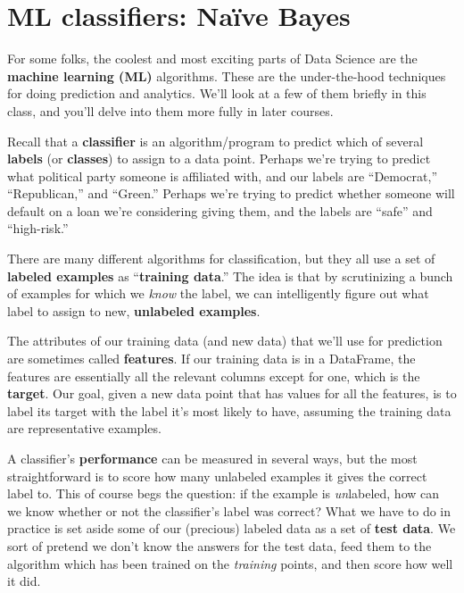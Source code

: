 

\chapter{ML classifiers: Na\"{i}ve Bayes}
\label{ch:naiveBayes}

For some folks, the coolest and most exciting parts of Data Science are the
\textbf{machine learning (ML)} algorithms. These are the under-the-hood
techniques for doing prediction and analytics. We'll look at a few of them
briefly in this class, and you'll delve into them more fully in later courses.

Recall that a \textbf{classifier} is an algorithm/program to predict which of
several \textbf{labels} (or \textbf{classes}) to assign to a data point.
Perhaps we're trying to predict what political party someone is affiliated
with, and our labels are ``Democrat,'' ``Republican,'' and ``Green.'' Perhaps
we're trying to predict whether someone will default on a loan we're
considering giving them, and the labels are ``safe'' and ``high-risk.''

There are many different algorithms for classification, but they all use a set
of \textbf{labeled examples} as ``\textbf{training data}.'' The idea is that by
scrutinizing a bunch of examples for which we \textit{know} the label, we can
intelligently figure out what label to assign to new, \textbf{unlabeled
examples}.

The attributes of our training data (and new data) that we'll use for
prediction are sometimes called \textbf{features}. If our training data is in
a DataFrame, the features are essentially all the relevant columns except for
one, which is the \textbf{target}. Our goal, given a new data point that has
values for all the features, is to label its target with the label it's most
likely to have, assuming the training data are representative examples. 

A classifier's \textbf{performance} can be measured in several ways, but the
most straightforward is to score how many unlabeled examples it gives the
correct label to. This of course begs the question: if the example is
\textit{un}labeled, how can we know whether or not the classifier's label was
correct? What we have to do in practice is set aside some of our (precious)
labeled data as a set of \textbf{test data}. We sort of pretend we don't know
the answers for the test data, feed them to the algorithm which has been
trained on the \textit{training} points, and then score how well it did.

